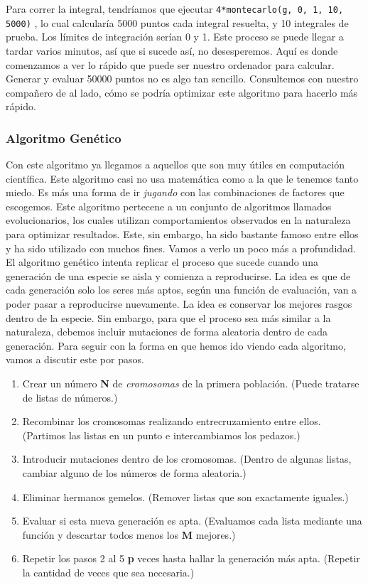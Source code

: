 \documentclass[10pt,letterpaper]{article}
\newcommand{\inlinecode}[1]{
\colorbox{light-gray}{\texttt{#1}}
}
\begin{document}
Para correr la integral, tendr\'iamos que ejecutar \inlinecode{4*montecarlo(g, 0, 1, 10, 5000)}, lo cual calcular\'ia 5000 puntos cada integral resuelta, y 10 integrales de prueba. Los l\'imites de integraci\'on ser\'ian 0 y 1. Este proceso se puede llegar a tardar varios minutos, as\'i que si sucede as\'i, no desesperemos. Aqu\'i es donde comenzamos a ver lo r\'apido que puede ser nuestro ordenador para calcular. Generar y evaluar 50000 puntos no es algo tan sencillo. Consultemos con nuestro compa\~nero de al lado, c\'omo se podr\'ia optimizar este algoritmo para hacerlo m\'as r\'apido.

\subsubsection{Algoritmo Gen\'etico}
Con este algoritmo ya llegamos a aquellos que son muy \'utiles en computaci\'on cient\'ifica. Este algoritmo casi no usa matem\'atica como a la que le tenemos tanto miedo. Es m\'as una forma de ir \textit{jugando} con las combinaciones de factores que escogemos. Este algoritmo pertecene a un conjunto de algoritmos llamados evolucionarios, los cuales utilizan comportamientos observados en la naturaleza para optimizar resultados. Este, sin embargo, ha sido bastante famoso entre ellos y ha sido utilizado con muchos fines. Vamos a verlo un poco m\'as a profundidad.\\

El algoritmo gen\'etico intenta replicar el proceso que sucede cuando una generaci\'on de una especie se aisla y comienza a reproducirse. La idea es que de cada generaci\'on solo los seres m\'as aptos, seg\'un una funci\'on de evaluaci\'on, van a poder pasar a reproducirse nuevamente. La idea es conservar los mejores rasgos dentro de la especie. Sin embargo, para que el proceso sea m\'as similar a la naturaleza, debemos incluir mutaciones de forma aleatoria dentro de cada generaci\'on. Para seguir con la forma en que hemos ido viendo cada algoritmo, vamos a discutir este por pasos.\\

\begin{enumerate}
\item Crear un n\'umero \textbf{N} de \emph{cromosomas} de la primera poblaci\'on. (Puede tratarse de listas de n\'umeros.)
\item Recombinar los cromosomas realizando entrecruzamiento entre ellos. (Partimos las listas en un punto e intercambiamos los pedazos.)
\item Introducir mutaciones dentro de los cromosomas. (Dentro de algunas listas, cambiar alguno de los n\'umeros de forma aleatoria.)
\item Eliminar hermanos gemelos. (Remover listas que son exactamente iguales.)
\item Evaluar si esta nueva generaci\'on es apta. (Evaluamos cada lista mediante una funci\'on y descartar todos menos los \textbf{M} mejores.)
\item Repetir los pasos 2 al 5 \textbf{p} veces hasta hallar la generaci\'on m\'as apta. (Repetir la cantidad de veces que sea necesaria.)
\end{enumerate}
\end{document}
